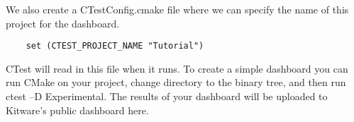 \documentclass[UTF8,a4paper,8pt]{ctexart}
\begin{document}
	We also create a CTestConfig.cmake file where we can specify the name of this project for the dashboard.
	\begin{lstlisting}
	set (CTEST_PROJECT_NAME "Tutorial")	
	\end{lstlisting}
	CTest will read in this file when it runs. To create a simple dashboard you can run CMake on your project, change directory to the binary tree, and then run ctest –D Experimental. The results of your dashboard will be uploaded to Kitware’s public dashboard here.

     
\end{document}
